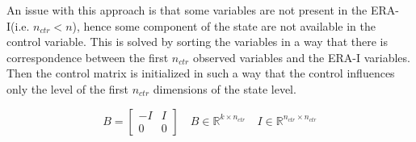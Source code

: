 \documentclass{article}
\newcommand{\norm}[3]{\mathcal{N}\left(#1; #2, #3\right)} %
\begin{document}
An issue with this approach is that some variables are not present in the ERA-I(i.e. $n_{ctr} < n$), hence some component of the state are not available in the control variable. This is solved by sorting the variables in a way that there is correspondence between the first $n_{ctr}$ observed variables and the ERA-I variables. Then the control matrix is initialized in such a way that the control influences only the level of the first $n_{ctr}$ dimensions of the state level.

\[
B = \begin{bmatrix}-I & I \\ 0 & 0\end{bmatrix} \quad B \in \mathbb{R}^{k \times n_{ctr}} \quad I \in \mathbb{R}^{n_{ctr} \times n_{ctr}}
\]











\end{document}
